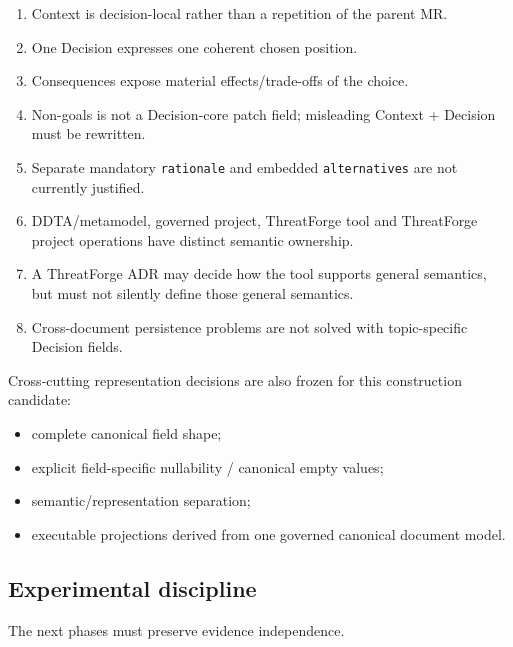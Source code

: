 \documentclass[
  10pt,
]{article}
\providecommand{\tightlist}{%
  \setlength{\itemsep}{0pt}\setlength{\parskip}{0pt}}
\begin{document}
\begin{enumerate}
\def\labelenumi{\arabic{enumi}.}
\tightlist
\item
  Context is decision-local rather than a repetition of the parent MR.
\item
  One Decision expresses one coherent chosen position.
\item
  Consequences expose material effects/trade-offs of the choice.
\item
  Non-goals is not a Decision-core patch field; misleading Context +
  Decision must be rewritten.
\item
  Separate mandatory \texttt{rationale} and embedded
  \texttt{alternatives} are not currently justified.
\item
  DDTA/metamodel, governed project, ThreatForge tool and ThreatForge
  project operations have distinct semantic ownership.
\item
  A ThreatForge ADR may decide how the tool supports general semantics,
  but must not silently define those general semantics.
\item
  Cross-document persistence problems are not solved with topic-specific
  Decision fields.
\end{enumerate}

Cross-cutting representation decisions are also frozen for this
construction candidate:

\begin{itemize}
\tightlist
\item
  complete canonical field shape;
\item
  explicit field-specific nullability / canonical empty values;
\item
  semantic/representation separation;
\item
  executable projections derived from one governed canonical document
  model.
\end{itemize}

\subsection{Experimental discipline}\label{experimental-discipline}

The next phases must preserve evidence independence.
\end{document}
